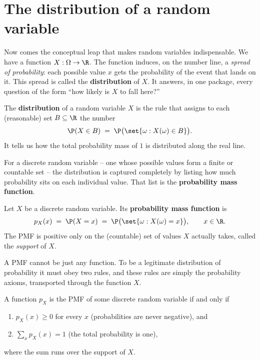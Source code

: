 \section{The distribution of a random variable}
\label{ch06:distribution}

Now comes the conceptual leap that makes random variables indispensable. We have a
function $X : \Omega \to \R$. The function induces, on the number line, a \emph{spread
of probability}: each possible value $x$ gets the probability of the event that lands
on it. This spread is called the \textbf{distribution} of $X$. It answers, in one
package, every question of the form ``how likely is $X$ to fall here?''

\begin{definition}[Distribution]
\label{ch06:def-distribution}
The \textbf{distribution} of a random variable $X$ is the rule that assigns to each
(reasonable) set $B \subseteq \R$ the number
\[
  \P(X \in B) \;=\; \P\big(\set{\omega : X(\omega) \in B}\big).
\]
It tells us how the total probability mass of $1$ is distributed along the real line.
\end{definition}

For a discrete random variable -- one whose possible values form a finite or countable
set -- the distribution is captured completely by listing how much probability sits on
each individual value. That list is the \textbf{probability mass function}.

\begin{definition}
\label{ch06:def-pmf}
Let $X$ be a discrete random variable. Its \textbf{probability mass function} is
\[
  p_X(x) \;=\; \P(X = x) \;=\; \P\big(\set{\omega : X(\omega) = x}\big),
  \qquad x \in \R.
\]
The PMF is positive only on the (countable) set of values $X$ actually takes, called
the \emph{support} of $X$.
\end{definition}

A PMF cannot be just any function. To be a legitimate distribution of probability it
must obey two rules, and these rules are simply the probability axioms, transported
through the function $X$.

\begin{proposition}
\label{ch06:prop-valid-pmf}
A function $p_X$ is the PMF of some discrete random variable if and only if
\begin{enumerate}
  \item $p_X(x) \ge 0$ for every $x$ (probabilities are never negative), and
  \item $\displaystyle\sum_{x} p_X(x) = 1$ (the total probability is one),
\end{enumerate}
where the sum runs over the support of $X$.
\end{proposition}


